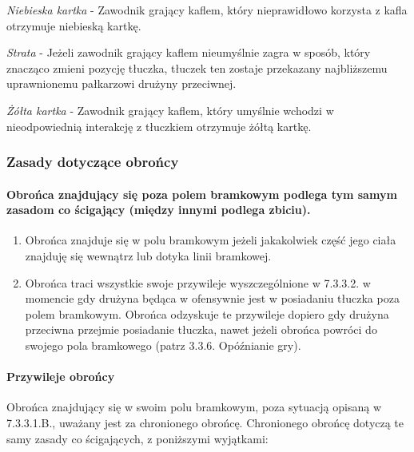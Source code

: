 \documentclass[12pt]{article}
\begin{document}
\emph{Niebieska kartka} - Zawodnik grający kaflem, który nieprawidłowo
korzysta z kafla otrzymuje niebieską kartkę.

\emph{Strata} - Jeżeli zawodnik grający kaflem nieumyślnie zagra w
sposób, który znacząco zmieni pozycję tłuczka, tłuczek ten zostaje
przekazany najbliższemu uprawnionemu pałkarzowi drużyny przeciwnej.

\emph{Żółta kartka} - Zawodnik grający kaflem, który umyślnie wchodzi w
nieodpowiednią interakcję z tłuczkiem otrzymuje żółtą kartkę.

\subsubsection{Zasady dotyczące obrońcy}

\paragraph{Obrońca znajdujący się poza polem bramkowym podlega
tym samym zasadom co ścigający (między innymi podlega zbiciu).}

\begin{enumerate}
\item
    Obrońca znajduje się w polu bramkowym jeżeli jakakolwiek część jego
  ciała znajduję się wewnątrz lub dotyka linii bramkowej.
  \item
    Obrońca traci wszystkie swoje przywileje wyszczególnione w 7.3.3.2. w
  momencie gdy drużyna będąca w ofensywnie jest w posiadaniu tłuczka
  poza polem bramkowym. Obrońca odzyskuje te przywileje dopiero gdy
  drużyna przeciwna przejmie posiadanie tłuczka, nawet jeżeli obrońca
  powróci do swojego pola bramkowego (patrz 3.3.6. Opóźnianie gry).
  \end{enumerate}

\paragraph{Przywileje obrońcy}
Obrońca znajdujący się w swoim
polu bramkowym, poza sytuacją opisaną w 7.3.3.1.B., uważany jest za
chronionego obrońcę. Chronionego obrońcę dotyczą te samy zasady co
ścigających, z poniższymi wyjątkami:
\end{document}
